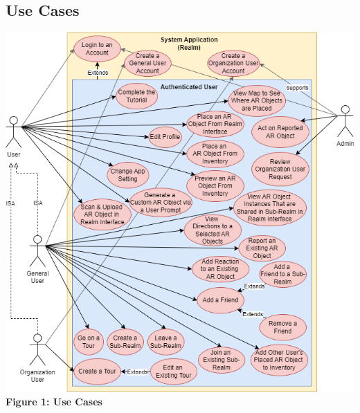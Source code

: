\documentclass{article}
\begin{document}
\subsection{Use Cases}
\label{sub:use_cases}

\begin{center}
    \includegraphics[scale=0.5]{use_cases.png}\\
    \textbf{Figure 1: Use Cases}
\end{center}
\end{document}
